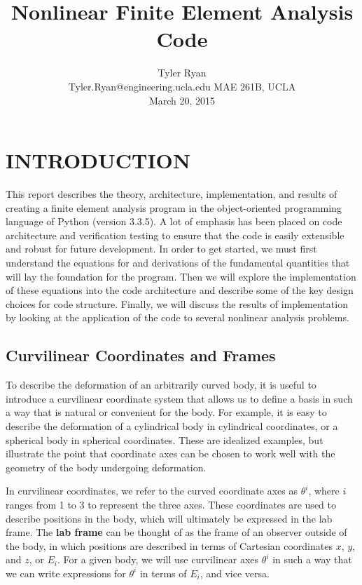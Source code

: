 \documentclass[]{spie}  %
\title{Nonlinear Finite Element Analysis Code}
\author{Tyler Ryan \\
	Tyler.Ryan@engineering.ucla.edu
\skiplinehalf
MAE 261B, UCLA \\
March 20, 2015
}
\begin{document}
 
\maketitle 

\tableofcontents

\section{INTRODUCTION}
\label{section: introduction}
This report describes the theory, architecture, implementation, and results of creating a finite element analysis program in the object-oriented programming language of Python (version 3.3.5). A lot of emphasis has been placed on code architecture and verification testing to ensure that the code is easily extensible and robust for future development. In order to get started, we must first understand the equations for and derivations of the fundamental quantities that will lay the foundation for the program. Then we will explore the implementation of these equations into the code architecture and describe some of the key design choices for code structure. Finally, we will discuss the results of implementation by looking at the application of the code to several nonlinear analysis problems. 

\subsection{Curvilinear Coordinates and Frames}
To describe the deformation of an arbitrarily curved body, it is useful to introduce a curvilinear coordinate system that allows us to define a basis in such a way that is natural or convenient for the body. For example, it is easy to describe the deformation of a cylindrical body in cylindrical coordinates, or a spherical body in spherical coordinates. These are idealized examples, but illustrate the point that coordinate axes can be chosen to work well with the geometry of the body undergoing deformation. 

In curvilinear coordinates, we refer to the curved coordinate axes as $\theta^i$, where $i$ ranges from 1 to 3 to represent the three axes. These coordinates are used to describe positions in the body, which will ultimately be expressed in the lab frame. The \textbf{lab frame} can be thought of as the frame of an observer outside of the body, in which positions are described in terms of Cartesian coordinates $x$, $y$, and $z$, or $E_i$. For a given body, we will use curvilinear axes $\theta^i$ in such a way that we can write expressions for $\theta^i$ in terms of $E_i$, and vice versa. 
\end{document}
